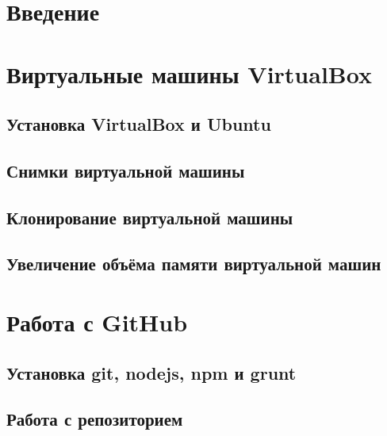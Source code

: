 \documentclass[oneside,final,14pt]{extarticle} %
\begin{document}


\setcounter{page}{2}

\setlength{\parindent}{1.25cm}

\tableofcontents
\newpage

\section*{Введение}

\newpage

\section{Виртуальные машины VirtualBox}
\subsection{Установка VirtualBox и Ubuntu}

\newpage

\subsection{Снимки виртуальной машины}

\newpage

\subsection{Клонирование виртуальной машины}

\newpage

\subsection{Увеличение объёма памяти виртуальной машин}

\newpage

\section{Работа с GitHub}
\subsection{Установка git, nodejs, npm и grunt}

\newpage

\subsection{Работа с репозиторием}

\newpage
\end{document}
